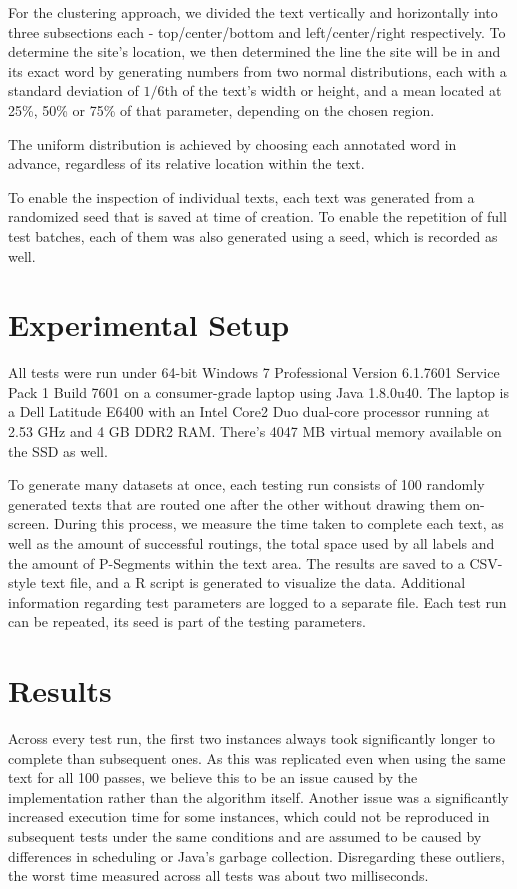 \documentclass[11pt,a4paper]{vutinfth}
\begin{document}
For the clustering approach, we divided the text vertically and horizontally into three subsections each - top/center/bottom and left/center/right respectively. To determine the site's location, we then determined the line the site will be in and its exact word by generating numbers from two normal distributions, each with a standard deviation of $1/6$th of the text's width or height, and a mean located at 25\%, 50\% or 75\% of that parameter, depending on the chosen region.

The uniform distribution is achieved by choosing each annotated word in advance, regardless of its relative location within the text.

To enable the inspection of individual texts, each text was generated from a randomized seed that is saved at time of creation. To enable the repetition of full test batches, each of them was also generated using a seed, which is recorded as well.

\section{Experimental Setup}

All tests were run under 64-bit Windows 7 Professional Version 6.1.7601 Service Pack 1 Build 7601 on a consumer-grade laptop using Java 1.8.0u40. The laptop is a Dell Latitude E6400 with an Intel Core2 Duo dual-core processor running at 2.53 GHz and 4 GB DDR2 RAM. There's 4047 MB virtual memory available on the SSD as well.

To generate many datasets at once, each testing run consists of 100 randomly generated texts that are routed one after the other without drawing them on-screen. During this process, we measure the time taken to complete each text, as well as the amount of successful routings, the total space used by all labels and the amount of P-Segments within the text area.
The results are saved to a CSV-style text file, and a R script is generated to visualize the data. Additional information regarding test parameters are logged to a separate file.
Each test run can be repeated, its seed is part of the testing parameters.

\section{Results}

Across every test run, the first two instances always took significantly longer to complete than subsequent ones. As this was replicated even when using the same text for all 100 passes, we believe this to be an issue caused by the implementation rather than the algorithm itself. 
Another issue was a significantly increased execution time for some instances, which could not be reproduced in subsequent tests under the same conditions and are assumed to be caused by differences in scheduling or Java's garbage collection. Disregarding these outliers, the worst time measured across all tests was about two milliseconds.%
\end{document}
